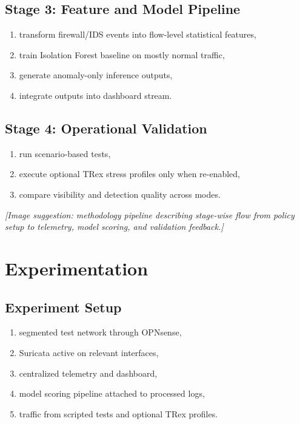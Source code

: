 \documentclass[12pt,a4paper]{article}
\begin{document}
\subsection{Stage 3: Feature and Model Pipeline}
\begin{enumerate}
    \item transform firewall/IDS events into flow-level statistical features,
    \item train Isolation Forest baseline on mostly normal traffic,
    \item generate anomaly-only inference outputs,
    \item integrate outputs into dashboard stream.
\end{enumerate}

\subsection{Stage 4: Operational Validation}
\begin{enumerate}
    \item run scenario-based tests,
    \item execute optional TRex stress profiles only when re-enabled,
    \item compare visibility and detection quality across modes.
\end{enumerate}

\textit{[Image suggestion: methodology pipeline describing stage-wise flow from policy setup to telemetry, model scoring, and validation feedback.]}

\section{Experimentation}

\subsection{Experiment Setup}
\begin{enumerate}
    \item segmented test network through OPNsense,
    \item Suricata active on relevant interfaces,
    \item centralized telemetry and dashboard,
    \item model scoring pipeline attached to processed logs,
    \item traffic from scripted tests and optional TRex profiles.
\end{enumerate}
\end{document}
